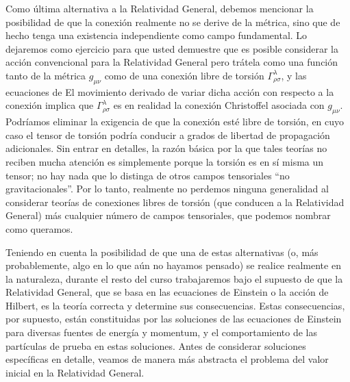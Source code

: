 \documentclass[11pt,b5paper,openany,twoside]{book}
\newcommand{\mn}{{\mu\nu}}
\begin{document}
Como última alternativa a la Relatividad General, debemos mencionar la posibilidad de que la conexión realmente no se derive de la métrica, sino que de hecho tenga una existencia independiente como campo fundamental.
Lo dejaremos como ejercicio para que usted demuestre que es posible considerar la acción convencional para la Relatividad General pero trátela como una función tanto de la métrica $g_\mn$ como de una conexión libre de torsión $\Gamma^\lambda_{\rho\sigma}$, y las ecuaciones de El movimiento derivado de variar dicha acción con respecto a la conexión implica que $\Gamma^\lambda_{\rho\sigma}$ es en realidad la conexión Christoffel asociada con $g_\mn$.
Podríamos eliminar la exigencia de que la conexión esté libre de torsión, en cuyo caso el tensor de torsión podría conducir a grados de libertad de propagación adicionales.
Sin entrar en detalles, la razón básica por la que tales teorías no reciben mucha atención es simplemente porque la torsión es en sí misma un tensor; no hay nada que lo distinga de otros campos tensoriales ``no gravitacionales''.
Por lo tanto, realmente no perdemos ninguna generalidad al considerar teorías de conexiones libres de torsión (que conducen a la Relatividad General) más cualquier número de campos tensoriales, que podemos nombrar como queramos.

Teniendo en cuenta la posibilidad de que una de estas alternativas (o, más probablemente, algo en lo que aún no hayamos pensado) se realice realmente en la naturaleza, durante el resto del curso trabajaremos bajo el supuesto de que la Relatividad General, que se basa en las ecuaciones de Einstein o la acción de Hilbert, es la teoría correcta y determine sus consecuencias.
Estas consecuencias, por supuesto, están constituidas por las soluciones de las ecuaciones de Einstein para diversas fuentes de energía y momentum, y el comportamiento de las partículas de prueba en estas soluciones.
Antes de considerar soluciones específicas en detalle, veamos de manera más abstracta el problema del valor inicial en la Relatividad General.
\end{document}
